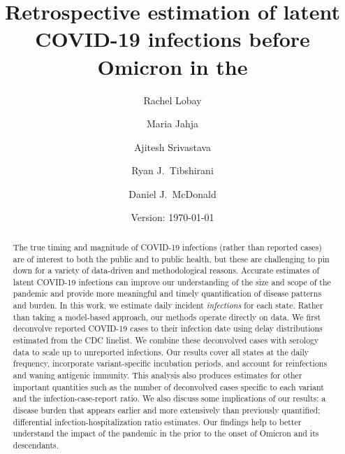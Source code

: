 \documentclass{article}
\begin{document}
\title{Retrospective estimation of latent COVID-19 infections before Omicron in the \US}
\author[a,1]{Rachel Lobay}
\author[b]{Maria Jahja}
\author[c]{Ajitesh Srivastava}
\author[d]{Ryan J.\ Tibshirani}
\author[a]{Daniel J.\ McDonald}





\date{Version: \today}
\maketitle

\begin{abstract}
The true timing and magnitude of COVID-19 infections (rather than reported
cases) are of interest to both the public and to public health, but these are
challenging to pin down for a variety of data-driven and methodological reasons.
Accurate estimates of latent COVID-19 infections can improve our understanding
of the size and scope of the pandemic and provide more meaningful and timely
quantification of disease patterns and burden. In this work, we estimate daily
incident \emph{infections} for each \US state. Rather than taking a model-based
approach, our methods operate directly on data. We first deconvolve reported
COVID-19 cases to their infection date using delay distributions estimated from
the CDC linelist. We combine these deconvolved cases with serology data to scale
up to unreported infections. Our results cover all states at the daily
frequency, incorporate variant-specific incubation periods, and account for
reinfections and waning antigenic immunity. This analysis also produces
estimates for other important quantities such as the number of deconvolved cases
specific to each variant and the infection-case-report ratio. We also discuss some
implications of our results: a disease burden that appears earlier and more
extensively than previously quantified; differential infection-hospitalization
ratio estimates. Our findings help to better understand the impact of the
pandemic in the \US prior to the onset of Omicron and its descendants. 

\end{abstract}
\end{document}
